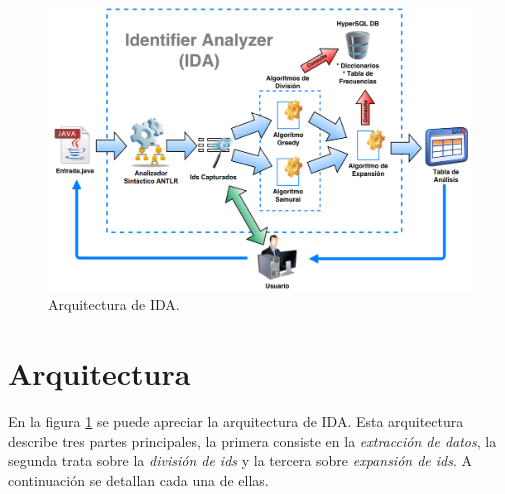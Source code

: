 %



\begin{figure}[t] %
\centerline{%
\includegraphics[scale= 0.35]{./cap4/ida_arq.png}
}
\caption{Arquitectura de IDA.}
\label{arq1}
\end{figure}


\section{Arquitectura}


En la figura \ref{arq1} se puede apreciar la arquitectura de IDA. Esta arquitectura describe tres partes principales, la primera consiste en la \textit{extracción de datos}, la segunda trata sobre la \textit{división de ids} y la tercera sobre \textit{expansión de ids}. A continuación se detallan cada una de ellas.\\

